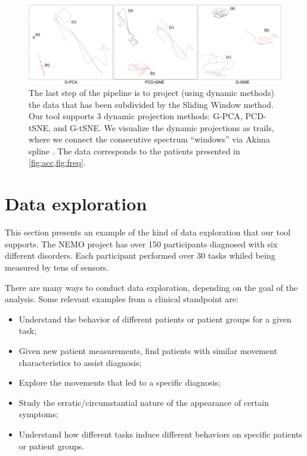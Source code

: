 \begin{figure}[ht]
\centering
\includegraphics[width=\linewidth]{figures/nemo/nemo1-projections.pdf}
\caption{The last step of the pipeline is to project (using dynamic methods) the data that has been subdivided by the Sliding Window method. Our tool supports 3 dynamic projection methods: G-PCA, PCD-tSNE, and G-tSNE. We visualize the dynamic projections as trails, where we connect the consecutive spectrum ``windows'' via Akima spline \citep{akima}. The data corresponds to the patients presented in \cref{fig:acc,fig:freq}.}
\label{fig:nemo1-projections}
\end{figure}

\section{Data exploration}

This section presents an example of the kind of data exploration that our tool supports. The NEMO project has over 150 participants diagnosed with six different disorders. Each participant performed over 30 tasks whiled being measured by tens of sensors.

There are many ways to conduct data exploration, depending on the goal of the analysis. Some relevant examples from a clinical standpoint are:
\begin{itemize}
  \item Understand the behavior of different patients or patient groups for a given task; 
  \item Given new patient measurements, find patients with similar movement characteristics to assist diagnosis;
  \item Explore the movements that led to a specific diagnosis;
  \item Study the erratic/circumstantial nature of the appearance of certain symptoms;
  \item Understand how different tasks induce different behaviors on specific patients or patient groups. 
\end{itemize}


